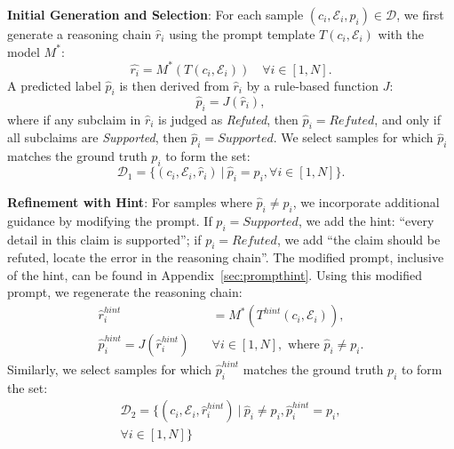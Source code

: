 \textbf{Initial Generation and Selection}: For each sample $(c_i,\mathcal{E}_i,p_i)\in \mathcal{D}$, we first generate a reasoning chain $\hat r_i$ using the prompt template $T(c_i,\mathcal{E}_i)$ with the model $M^*$:\begin{equation*}\hat{r_i}=M^*(T(c_i,\mathcal{E}_i))\quad \forall i\in[1,N].\end{equation*} A predicted label $\hat p_i$ is then derived from $\hat r_i$ by a rule-based function $J$: \begin{equation*}\hat p_i=J(\hat r_i),
\end{equation*}where if any subclaim in $\hat r_i$ is judged as \textit{Refuted}, then $\hat p_i=\textit{Refuted}$, and only if all subclaims are \textit{Supported}, then $\hat p_i=\textit{Supported}$. We select samples for which $\hat p_i$ matches the ground truth $p_i$ to form the set:\begin{equation*}\mathcal{D}_1=\{(c_i,\mathcal{E}_i,\hat r_i)\ |\ \hat p_i=p_i,\forall i\in [1,N]\}.\end{equation*}


\textbf{Refinement with Hint}: For samples where $\hat p_i\neq p_i$, we incorporate additional guidance by modifying the prompt. If $p_i = \textit{Supported}$, we add the hint: ``every detail in this claim is supported''; if $p_i=\textit{Refuted}$, we add ``the claim should be refuted, locate the error in the reasoning chain''. The modified prompt, inclusive of the hint, can be found in Appendix~\ref{sec:prompthint}. Using this modified prompt, we regenerate the reasoning chain: \begin{equation*}\begin{aligned}\hat r_i^{hint}&=M^*(T^{hint}(c_i,\mathcal{E}_i)),\\ \hat p_i^{hint}=J(\hat r_i^{hint})\quad &\forall i\in[1,N], \text{ where }\hat p_i\neq p_i.\end{aligned}\end{equation*}
Similarly, we select samples for which $\hat p_i^{hint}$ matches the ground truth $p_i$ to form the set:\begin{multline*}\mathcal{D}_2=\{(c_i,\mathcal{E}_i,\hat r_i^{hint})\ |\ \hat p_i\neq p_i,\hat p^{hint}_i= p_i,\\\forall i\in [1,N]\}\end{multline*} 

